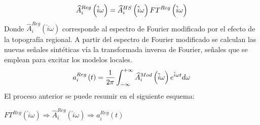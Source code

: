 \documentclass[spanish,letterpaper,12pt,twoside,openany]{article}
\begin{document}
%
	\begin{align}\label{eq:espfoumod}
		\widehat{A}^{Reg}_{i} \left( \hat{i} \omega \right) = \widehat{A}^{HS}_{i} \left( \hat{i} \omega \right) FT^{Reg} \left( \hat{i} \omega \right)
	\vspace{-1 cm}
	\end{align}
%
Donde $\widehat{A}^{Reg}_{i} \left( \hat{i} \omega \right)$ corresponde al espectro de Fourier modificado por el efecto de la topografía regional. A partir del espectro de Fourier modificado se calculan las nuevas señales sintéticas vía la transformada inversa de Fourier, señales que se emplean para excitar los modelos locales.
%
	\begin{align}\label{eq:fourinv}
		a_{i}^{Reg} \left( t \right) = \dfrac{1}{2 \pi} \int_{-\infty}^{+\infty} \widehat{A}^{Mod}_{i} \left( \hat{i} \omega \right) e^{\hat{i} \omega t} d \omega
	\vspace{-1 cm}
	\end{align}
%
El proceso anterior se puede resumir en el siguiente esquema:

	$FT^{Reg} \left( \hat{i} \omega \right) \Rightarrow \widehat{A}^{Reg}_{i} \left( \hat{i} \omega \right) \Rightarrow a_{i}^{Reg}\left( t \right)$
\end{document}
